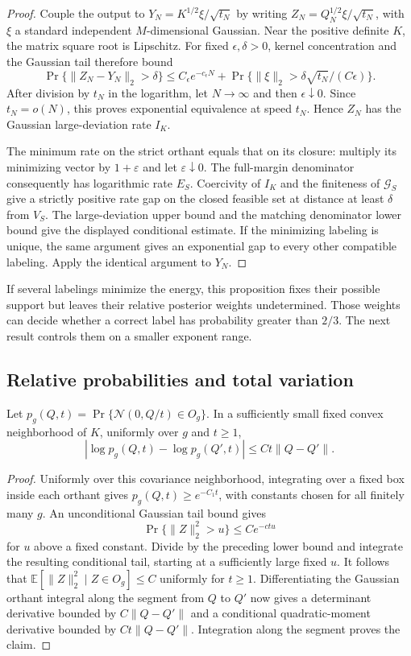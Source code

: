 \begin{proof}
Couple the output to $Y_N=K^{1/2}\xi/\sqrt{t_N}$ by writing
$Z_N=Q_N^{1/2}\xi/\sqrt{t_N}$, with $\xi$ a standard independent
$M$-dimensional Gaussian. Near the positive definite $K$, the matrix
square root is Lipschitz. For fixed $\epsilon,\delta>0$, kernel
concentration and the Gaussian tail therefore bound
\[
 \Pr\{\|Z_N-Y_N\|_2>\delta\}
 \le C_\epsilon e^{-c_\epsilon N}
 +\Pr\{\|\xi\|_2>\delta\sqrt{t_N}/(C\epsilon)\}.
\]
After division by $t_N$ in the logarithm, let $N\to\infty$ and then
$\epsilon\downarrow0$. Since $t_N=o(N)$, this proves exponential
equivalence at speed $t_N$. Hence $Z_N$ has the Gaussian large-deviation
rate $I_K$.

The minimum rate on the strict orthant equals that on its closure:
multiply its minimizing vector by $1+\varepsilon$ and let
$\varepsilon\downarrow0$. The full-margin denominator consequently
has logarithmic rate $E_S$. Coercivity of $I_K$ and the finiteness of
$\mathcal G_S$ give a strictly positive rate gap on the closed feasible
set at distance at least $\delta$ from $V_S$. The large-deviation upper
bound and the matching denominator lower bound give the displayed
conditional estimate. If the minimizing labeling is unique, the same
argument gives an exponential gap to every other compatible labeling.
Apply the identical argument to $Y_N$.
\end{proof}

If several labelings minimize the energy, this proposition fixes their
possible support but leaves their relative posterior weights undetermined.
Those weights can decide whether a correct label has probability greater
than $2/3$. The next result controls them on a smaller exponent range.

\subsection{Relative probabilities and total variation}

\begin{lemma}
\label{lem:cmp-log-lipschitz}
Let $p_g(Q,t)=\Pr\{\mathcal N(0,Q/t)\in O_g\}$. In a sufficiently
small fixed convex neighborhood of $K$, uniformly over $g$ and $t\ge1$,
\[
 |\log p_g(Q,t)-\log p_g(Q',t)|\le Ct\|Q-Q'\|.
\]
\end{lemma}

\begin{proof}
Uniformly over this covariance neighborhood, integrating over a fixed
box inside each orthant gives $p_g(Q,t)\ge e^{-C_1t}$, with constants
chosen for all finitely many $g$. An unconditional Gaussian tail bound
gives
\[
 \Pr\{\|Z\|_2^2>u\}\le C e^{-ctu}
\]
for $u$ above a fixed constant. Divide by the preceding lower bound
and integrate the resulting conditional tail, starting at a sufficiently
large fixed $u$. It follows that
$\mathbb E[\|Z\|_2^2\mid Z\in O_g]\le C$ uniformly for $t\ge1$.
Differentiating the Gaussian orthant integral along the segment from
$Q$ to $Q'$ now gives a determinant derivative bounded by
$C\|Q-Q'\|$ and a conditional quadratic-moment derivative bounded by
$Ct\|Q-Q'\|$. Integration along the segment proves the claim.
\end{proof}

